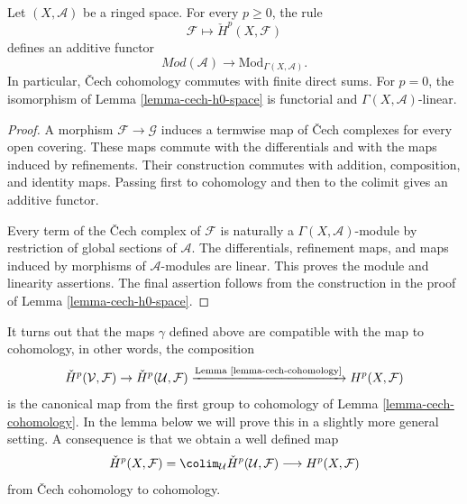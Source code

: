 \begin{lemma}
\label{lemma-cech-cohomology-additive}
\begin{reference}
\cite[Chapter I, \S 3, no. 23, pp. 215--216]{FAC}
\end{reference}
Let $(X, \mathcal{A})$ be a ringed space. For every $p \geq 0$, the rule
$$
\mathcal{F} \longmapsto \check{H}^p(X, \mathcal{F})
$$
defines an additive functor
$$
\textit{Mod}(\mathcal{A})
\longrightarrow
\text{Mod}_{\Gamma(X, \mathcal{A})}.
$$
In particular, {\v C}ech cohomology commutes with finite direct sums.
For $p = 0$, the isomorphism of Lemma \ref{lemma-cech-h0-space} is
functorial and $\Gamma(X, \mathcal{A})$-linear.
\end{lemma}

\begin{proof}
A morphism $\mathcal{F} \to \mathcal{G}$ induces a termwise map of
{\v C}ech complexes for every open covering. These maps commute with the
differentials and with the maps induced by refinements. Their construction
commutes with addition, composition, and identity maps. Passing first to
cohomology and then to the colimit gives an additive functor.

Every term of the {\v C}ech complex of $\mathcal{F}$ is naturally a
$\Gamma(X, \mathcal{A})$-module by restriction of global sections of
$\mathcal{A}$. The differentials, refinement maps, and maps induced by
morphisms of $\mathcal{A}$-modules are linear. This proves the module and
linearity assertions. The final assertion follows from the construction
in the proof of Lemma \ref{lemma-cech-h0-space}.
\end{proof}

\medskip\noindent
It turns out that the maps $\gamma$ defined above are compatible with
the map to cohomology, in other words, the composition
$$
\check{H}^p(\mathcal{V}, \mathcal{F}) \to
\check{H}^p(\mathcal{U}, \mathcal{F})
\xrightarrow{\text{Lemma \ref{lemma-cech-cohomology}}}
H^p(X, \mathcal{F})
$$
is the canonical map from the first group to cohomology of
Lemma \ref{lemma-cech-cohomology}. 
In the lemma below we will prove this in a slightly more general
setting. A consequence is that we obtain a well defined map
\begin{equation}
\label{equation-cech-to-cohomology}
\check{H}^p(X, \mathcal{F}) =
\colim_\mathcal{U} \check{H}^p(\mathcal{U}, \mathcal{F})
\longrightarrow
H^p(X, \mathcal{F})
\end{equation}
from {\v C}ech cohomology to cohomology.

